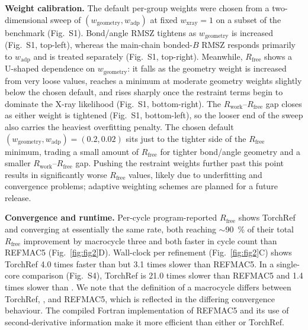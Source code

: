 \documentclass{iucrjournals}
\begin{document}
\textbf{Weight calibration.}
The default per-group weights were chosen from a two-dimensional sweep of
$(w_\mathrm{geometry}, w_\mathrm{adp})$ at fixed $w_\mathrm{xray} = 1$ on a
subset of the benchmark (Fig.\ S1).
Bond/angle RMSZ tightens as $w_\mathrm{geometry}$ is increased
(Fig.\ S1, top-left), whereas the main-chain bonded-$B$ RMSZ responds primarily
to $w_\mathrm{adp}$ and is treated separately (Fig.\ S1, top-right). Meanwhile,
$R_\mathrm{free}$ shows a U-shaped dependence on $w_\mathrm{geometry}$:
it falls as the geometry weight is increased from very loose values,
reaches a minimum at moderate geometry weights slightly below the chosen
default, and rises sharply once the restraint terms begin to dominate the
X-ray likelihood (Fig.\ S1, bottom-right).
The $R_\mathrm{work}$--$R_\mathrm{free}$ gap closes as either weight is
tightened (Fig.\ S1, bottom-left), so the looser end of the sweep also
carries the heaviest overfitting penalty.
The chosen default $(w_\mathrm{geometry}, w_\mathrm{adp}) = (0.2, 0.02)$
sits just to the tighter side of the $R_\mathrm{free}$ minimum, trading a
small amount of $R_\mathrm{free}$ for tighter bond/angle geometry and a smaller
$R_\mathrm{work}$--$R_\mathrm{free}$ gap.
Pushing the restraint weights further past this point results in significantly worse $R_\mathrm{free}$ values, 
likely due to underfitting and convergence problems; adaptive weighting schemes are planned for a future release.

\textbf{Convergence and runtime.}
Per-cycle program-reported $R_\mathrm{free}$ shows TorchRef and
 converging at essentially the same rate, both reaching
$\sim$\SI{90}{\percent} of their total $R_\mathrm{free}$ improvement by
macrocycle three and both faster in cycle count than REFMAC5
(Fig.\ \ref{fig:fig2}D).  Wall-clock per refinement (Fig.\ \ref{fig:fig2}C)
shows TorchRef \num{4.0} times faster than  but
\num{3.1} times slower than REFMAC5. In a single-core comparison (Fig.\ S4),
TorchRef is \num{21.0} times slower than REFMAC5 and \num{1.4} times slower than
.
We note that the definition of a macrocycle differs between TorchRef,
, and REFMAC5, which is reflected in the differing
convergence behaviour. The compiled Fortran implementation of REFMAC5 and its
use of second-derivative information make it more efficient than either
 or TorchRef.
\end{document}
